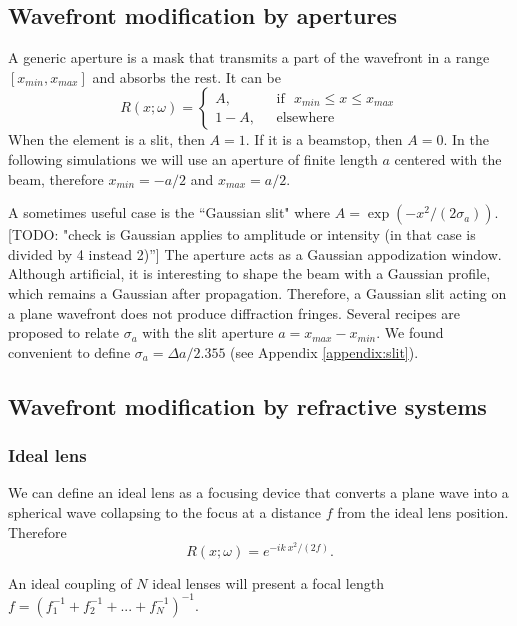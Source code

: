 \documentclass{iucr}              %
\newcommand{\todo}[1]{{\color{red}[TODO: "#1'']}}
\begin{document}
\subsection{Wavefront modification by apertures}

A generic aperture is a mask that transmits a part of the wavefront in a range $[x_{min},x_{max}]$ and absorbs the rest. It can be
\begin{equation}
R(x;\omega) =
\left\{
\begin{matrix}
A,  & \mbox{~~if~~} x_{min} \le x \le x_{max}
\\ 
1 - A, & \mbox{~~elsewhere}
\end{matrix}
\right.
\end{equation}
When the element is a slit, then $A=1$. If it is a beamstop, then $A=0$. In the following simulations we will use an aperture of finite length $a$ centered with the beam, therefore $x_{min}=-a/2$ and $x_{max}=a/2$.

A sometimes useful case is the ``Gaussian slit" where $A=\exp(-x^2/(2\sigma_a))$. \todo{check is Gaussian applies to amplitude or intensity (in that case is divided by 4 instead 2)} The aperture acts as a Gaussian appodization window. Although artificial, it is interesting to shape the beam with a Gaussian profile, which remains a Gaussian after propagation. Therefore, a Gaussian slit acting on a plane wavefront does not produce diffraction fringes. Several recipes are proposed to relate $\sigma_a$ with the slit aperture $a=x_{max}-x_{min}$. We found convenient to define $\sigma_a=\Delta a/2.355$ (see Appendix \ref{appendix:slit}).

\subsection{Wavefront modification by refractive systems}

\subsubsection{Ideal lens}
We can define an ideal lens as a focusing device that converts a plane wave into a spherical wave collapsing to the focus at a distance $f$ from the ideal lens position. Therefore
\begin{equation}
    R(x;\omega) = e^{-i k~x^2/(2 f)}.
\end{equation}

An ideal coupling of $N$ ideal lenses will present a focal length $f=(f_1^{-1}+f_2^{-1}+...+f_N^{-1})^{-1}$. 
\end{document}
